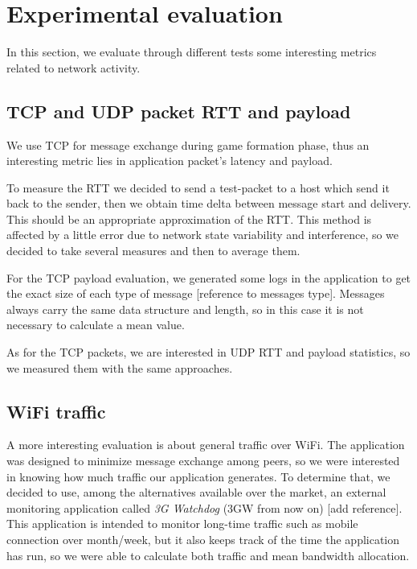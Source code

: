 \section{Experimental evaluation}

In this section, we evaluate through different tests some interesting metrics related to network activity.

\subsection{TCP and UDP packet RTT and payload}

We use TCP for message exchange during game formation phase, thus an interesting metric lies in application packet's latency and payload.
 
To measure the RTT we decided to send a test-packet to a host which send it back to the sender, then we obtain time delta between message start and delivery. This should be an appropriate approximation of the RTT. This method is affected by a little error due to network state variability and interference, so we decided to take several measures and then to average them.

For the TCP payload evaluation, we generated some logs in the application to get the exact size of each type of message [reference to messages type]. Messages always carry the same data structure and length, so in this case it is not necessary to calculate a mean value.

As for the TCP packets, we are interested in UDP RTT and payload statistics, so we measured them with the same approaches.

\subsection{WiFi traffic}

A more interesting evaluation is about general traffic over WiFi. The application was designed to minimize message exchange among peers, so we were interested in knowing how much traffic our application generates. To determine that, we decided to use, among the alternatives available over the market, an external monitoring application called \textit{3G Watchdog} (3GW from now on) [add reference]. This application is intended to monitor long-time traffic such as mobile connection over month/week, but it also keeps track of the time the application has run, so we were able to calculate both traffic and mean bandwidth allocation.

